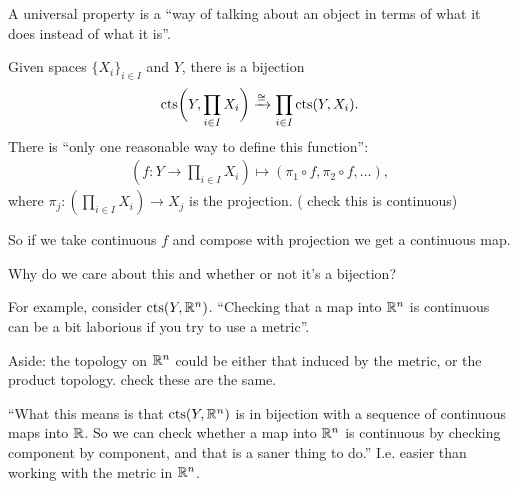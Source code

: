 A universal property is a ``way of talking about an object in terms of what it does instead of what
it is​''.

\begin{lemma}
  Given spaces $\{X_i\}_{i \in I}$ and $Y$, there is a bijection
  \begin{align*}
    \text{cts}\bigg(Y, \prod_{i \in I} X_i\bigg) \xrightarrow{\rm \cong} \prod_{i \in I} \text{cts}(Y, X_i).
  \end{align*}
  There is ``only one reasonable way to define this function​'':
  \begin{align*}
    (f: Y \to \prod_{i \in I} X_i) \mapsto (\pi_1 \circ f, \pi_2 \circ f, \ldots),
  \end{align*}
  where $\pi_j: (\prod_{i \in I} X_i) \to X_j$ is the projection. ( check this is continuous)
\end{lemma}

\begin{remark}
  So if we take continuous $f$ and compose with projection we get a continuous map.

  Why do we care about this and whether or not it's a bijection?

  For example, consider $\text{cts}(Y, \mathbb{R}^n)$. ``Checking that a map into $\mathbb{R}^n$ is continuous can be a
  bit laborious if you try to use a metric​''.

  Aside: the topology on $\mathbb{R}^n$ could be either that induced by the metric, or the product
  topology.  check these are the same.

  ``What this means is that $\text{cts}(Y, \mathbb{R}^n)$ is in bijection with a sequence of continuous maps
  into $\mathbb{R}$. So we can check whether a map into $\mathbb{R}^n$ is continuous by checking component by
  component, and that is a saner thing to do.​'' I.e. easier than working with the metric in $\mathbb{R}^n$.
\end{remark}

